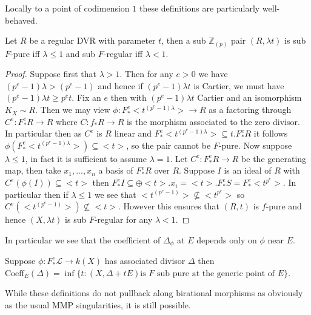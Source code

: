 \documentclass[a4paper,12pt]{book}
\newcommand{\Fe}[1][e]{F^{#1}_{*}}
\newcommand{\zp}{\mathbb{Z}_{(p)}}
\begin{document}
Locally to a point of codimension $1$ these definitions are particularly well-behaved.
\begin{lemma}
	Let $R$ be a regular DVR with parameter $t$, then a sub $\zp$ pair $(R,\lambda t)$ is sub $F$-pure iff $\lambda \leq 1$ and sub $F$-regular iff $\lambda < 1$.
\end{lemma}
\begin{proof}
	Suppose first that $\lambda > 1$. Then for any $e >0$ we have $(p^{e}-1)\lambda >(p^{e}-1)$ and hence if $(p^{e}-1)\lambda t$ is Cartier, we must have $(p^{e}-1)\lambda t \geq p^{e} t$. Fix an $e$ then with $(p^{e}-1)\lambda t$ Cartier and an isomorphism $K_{X}\sim R$. Then we may view $\phi: \Fe <t^{(p^{e}-1)\lambda}> \to R$ as a factoring through $C^{e}: \Fe R \to R$ where $C:f_{*}R \to R$ is the morphism associated to the zero divisor. In particular then as $C^{e}$ is $R$ linear and $\Fe <t^{(p^{e}-1)\lambda}> \subseteq t.\Fe R$ it follows $\phi(\Fe <t^{(p^{e}-1)\lambda}> ) \subseteq <t>$, so the pair cannot be $F$-pure.
	Now suppose $\lambda \leq 1$, in fact it is sufficient to assume $\lambda =1$.
	Let $C^{e}:\Fe R \to R$ be the generating map, then take $x_{1},...,x_{n}$ a basis of $\Fe R$ over $R$. Suppose $I$ is an ideal of $R$ with $C^{e}(\phi(I)) \subseteq <t>$ then $\Fe I \subseteq \oplus <t>.x_{i} =<t>.\Fe S= \Fe <t^{p^{e}}>$. In particular then if $\lambda \leq 1$ we see that  $<t^{(p^{e}-1)}>\not\subseteq <t^{p^{e}}>$ so $C^{e}(<t^{(p^{e}-1)}>) \not\subseteq <t>$. However this ensures that $(R,t)$ is $f$-pure and hence $(X,\lambda t)$ is sub $F$-regular for any $\lambda <1$.   
	\end{proof}
In particular we see that the coefficient of $\Delta_{\phi}$ at $E$ depends only on $\phi$ near $E$.

\begin{corollary}\label{local}
	Suppose $\phi:\Fe\mathcal{L} \to k(X)$ has associated divisor $\Delta$ then $\text{Coeff}_{E}(\Delta)=\inf\{t: (X,\Delta+tE) \text{is } F \text{ sub pure at the generic point of } E\}$. 
\end{corollary}

While these definitions do not pullback along birational morphisms as obviously as the usual MMP singularities, it is still possible.
\end{document}

